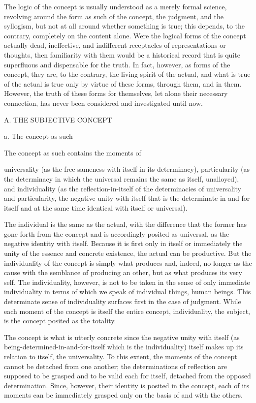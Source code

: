 The logic of the concept is
usually understood as a merely formal science,
revolving around the form as such of
the concept, the judgment, and the syllogism,
but not at all around whether something is true;
this depends, to the contrary, completely on the content alone.
Were the logical forms of the concept actually dead, ineffective,
and  indifferent receptacles of representations or thoughts,
then familiarity with them would be a historical record that
is quite superfluous and dispensable for the truth.
In fact, however, as forms of the concept, they are, to the contrary,
the living spirit of the actual, and what is true of the actual is true
only by virtue of these forms, through them, and in them.
However, the truth of these forms for themselves,
let alone their necessary connection,
has never been considered and investigated until now.

A. THE SUBJECTIVE CONCEPT

a. The concept as such

The concept as such contains the moments of

universality
(as the free sameness with itself in its determinacy),
particularity
(as the determinacy in which
the universal remains the same as itself, unalloyed),
and individuality
(as the reflection-in-itself of
the determinacies of universality and particularity,
the negative unity with itself
that is the determinate in and for itself
and at the same time identical with itself or universal).

The individual is the same as the actual,
with the difference that the former has
gone forth from the concept
and is accordingly posited as universal,
as the negative identity with itself.
Because it is first only in itself
or immediately the unity of
the essence and concrete existence,
the actual can be productive.
But the individuality of the concept is
simply what produces and, indeed,
no longer as the cause with
the semblance of producing an other,
but as what produces its very self.
The individuality, however, is
not to be taken in the sense of
only immediate individuality in terms of which
we speak of individual things, human beings.
This determinate sense of individuality
surfaces first in the case of judgment.
While each moment of the concept is
itself the entire concept,
individuality, the subject, is
the concept posited as the totality.

The concept is what is utterly concrete
since the negative unity with itself
(as being-determined-in-and-for-itself
which is the individuality)
itself makes up its relation to itself, the universality.
To this extent, the moments of the concept
cannot be detached from one another;
the determinations of reflection are supposed
to be grasped and to be valid each for itself,
detached from the opposed determination.
Since, however, their identity is posited in the concept,
each of its moments can be immediately grasped only
on the basis of and with the others.

